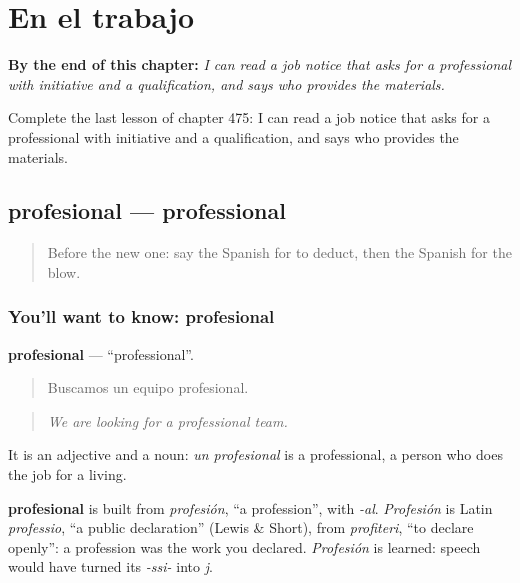 
\chapter{En el trabajo}
\label{ch:es-en-el-trabajo}

\begin{chapteropening}
\textbf{By the end of this chapter:} \emph{I can read a job notice that asks for a professional with initiative and a qualification, and says who provides the materials.}

Complete the last lesson of chapter 475: I can read a job notice that asks for a professional with initiative and a qualification, and says who provides the materials.
\end{chapteropening}

\section[profesional]{profesional — professional}

\label{lesson:ES-C475-profesional}



\begin{quote}
Before the new one: say the Spanish for to deduct, then the Spanish for the blow.
\end{quote}

\subsection*{You'll want to know: profesional}
\textbf{profesional} — \textquotedblleft{}professional\textquotedblright{}.

\begin{quote}
Buscamos un equipo profesional.
\end{quote}

\begin{quote}
\emph{We are looking for a professional team.}
\end{quote}

It is an adjective and a noun: \emph{un profesional} is a professional, a person who does the job for a living.

\begin{cousinweb}
\textbf{profesional} is built from \emph{profesión}, \textquotedblleft{}a profession\textquotedblright{}, with \emph{-al}. \emph{Profesión} is Latin \emph{professio}, \textquotedblleft{}a public declaration\textquotedblright{} (Lewis \& Short), from \emph{profiteri}, \textquotedblleft{}to declare openly\textquotedblright{}: a profession was the work you declared. \emph{Profesión} is learned: speech would have turned its \emph{-ssi-} into \emph{j}.
\end{cousinweb}

